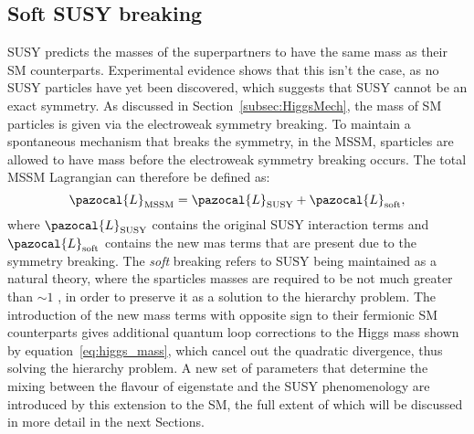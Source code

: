 	\subsection{Soft SUSY breaking}\label{subsec:softSUSY} 
	
	\ac{SUSY} predicts the masses of the superpartners to have the same mass as their \ac{SM} counterparts. 
	Experimental evidence shows that this isn't the case, as no \ac{SUSY} particles have yet been discovered, which suggests that \ac{SUSY} cannot be an exact symmetry. 
	As discussed in Section~\ref{subsec:HiggsMech}, the mass of \ac{SM} particles is given via the electroweak symmetry breaking. To maintain a spontaneous mechanism that breaks the symmetry, in the \ac{MSSM}, sparticles are allowed to have mass before the electroweak symmetry breaking occurs.
	The total \ac{MSSM} Lagrangian can therefore be defined as:
	\begin{equation}
	\pazocal{L}_{\mathrm{MSSM}} = \pazocal{L}_{\mathrm{SUSY}} + \pazocal{L}_{\mathrm{soft}},
	\end{equation}
	where $\pazocal{L}_{\mathrm{SUSY}}$ contains the original \ac{SUSY} interaction terms and $\pazocal{L}_{\mathrm{soft}}$ contains the new mas terms that are present due to the symmetry breaking.  
	The \textit{soft} breaking refers to \ac{SUSY} being maintained as a natural theory, where the sparticles masses are required to be not much greater than $\sim1$ \tev, in order to preserve it as a solution to the hierarchy problem.
	The introduction of the new mass terms with opposite sign to their fermionic \ac{SM} counterparts gives additional quantum loop corrections to the Higgs mass shown by equation~\ref{eq:higgs_mass}, which cancel out the quadratic divergence, thus solving the hierarchy problem.
	A new set of parameters that determine the mixing between the flavour of eigenstate and the \ac{SUSY} phenomenology are introduced by this extension to the \ac{SM}, the full extent of which will be discussed in more detail in the next Sections.%
